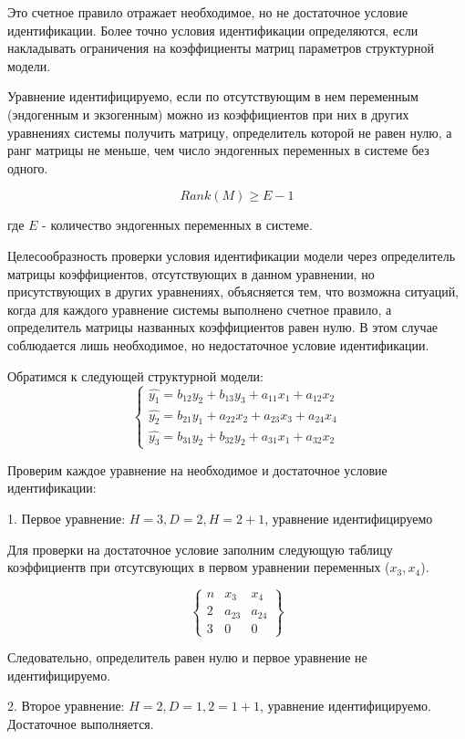 \documentclass[aps,%
12pt,%
final,%
oneside,
onecolumn,%
musixtex, %
superscriptaddress,%
centertags]{article} %
\begin{document}
Это счетное правило отражает необходимое, но не достаточное условие идентификации. Более точно условия идентификации определяются, если накладывать ограничения на коэффициенты матриц параметров структурной модели. 

Уравнение идентифицируемо, если по отсутствующим в нем переменным (эндогенным и экзогенным) можно из коэффициентов при них в других уравнениях системы получить матрицу, определитель которой не равен нулю, а ранг матрицы не меньше, чем число эндогенных переменных в системе без одного.

$$Rank(M) \geq E-1$$

где $E$ - количество эндогенных переменных в системе.

Целесообразность проверки условия идентификации модели через определитель матрицы коэффициентов, отсутствующих в данном уравнении, но присутствующих в других уравнениях, объясняется тем, что возможна ситуаций, когда для каждого уравнение системы выполнено счетное правило, а определитель матрицы названных коэффициентов равен нулю. В этом случае соблюдается лишь необходимое, но недостаточное условие идентификации.

Обратимся к следующей структурной модели:
$$\left \{
\begin{matrix}
	\hat{y_1} = b_{12}y_2 + b_{13}y_3  +  a_{11}x_1 + a_{12}x_2\\
	\hat{y_2} = b_{21}y_1 + a_{22}x_2  +  a_{23}x_3 + a_{24}x_4\\
	\hat{y_3} = b_{31}y_2 + b_{32}y_2  +  a_{31}x_1 + a_{32}x_2

\end{matrix}
\right.
$$

Проверим каждое уравнение на необходимое и достаточное условие идентификации:

1. Первое уравнение: $H=3, D = 2, H = 2 + 1$, уравнение идентифицируемо

Для проверки на достаточное условие заполним следующую таблицу коэффициентв при отсутсвующих в первом уравнении переменных ($x_3,x_4$).

$$\left \{
\begin{matrix}
	n & x_3 & x_4 \\
	2 & a_{23} & a_{24} \\
	3 & 0 & 0 

\end{matrix}
\right \}
$$

Следовательно, определитель равен нулю и первое уравнение не идентифицируемо.

2. Второе уравнение: $H=2, D = 1, 2 = 1 + 1$, уравнение идентифицируемо. Достаточное выполняется.
\end{document}
